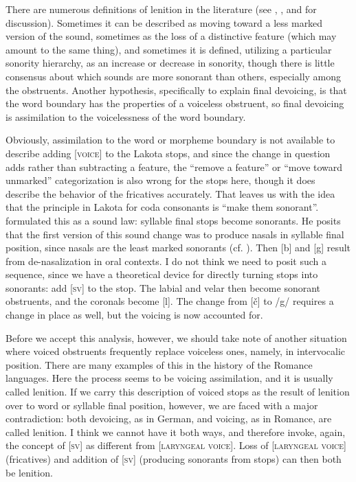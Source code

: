 \documentclass[output=paper]{LSP/langsci}
\begin{document}
There are numerous definitions of lenition in the literature (see \citealt{Honeybone2008}, \citealt{Harris2009}, and \citealt{Szigetvari2008} for discussion). Sometimes it can be described as moving toward a less marked version of the sound, sometimes as the loss of a distinctive feature (which may amount to the same thing), and sometimes it is defined, utilizing a particular sonority hierarchy, as an increase or decrease in sonority, though there is little consensus about which sounds are more sonorant than others, especially among the obstruents. Another hypothesis, specifically to explain final devoicing, is that the word boundary has the properties of a voiceless obstruent, so final devoicing is assimilation to the voicelessness of the word boundary.

Obviously, assimilation to the word or morpheme boundary is not available to describe adding [\textsc{voice}] to the Lakota stops, and since the change in question adds rather than subtracting a feature, the ``remove a feature'' or ``move toward unmarked'' categorization is also wrong for the stops here, though it does describe the behavior of the fricatives accurately. That leaves us with the idea that the principle in Lakota for coda consonants is ``make them sonorant''. \citet[5]{Rankin2001} formulated this as a sound law: syllable final stops become sonorants. He posits that the first version of this sound change was to produce nasals in syllable final position, since nasals are the least marked sonorants (cf. \citealt{Rice1993}). Then [b] and [g] result from de-nasalization in oral contexts. I do not think we need to posit such a sequence, since we have a theoretical device for directly turning stops into sonorants: add [\textsc{sv}] to the stop. The labial and velar then become sonorant obstruents, and the coronals become [l]. The change from [\v{c}] to /g/ requires a change in place as well, but the voicing is now accounted for.

Before we accept this analysis, however, we should take note of another situation where voiced obstruents frequently replace voiceless ones, namely, in intervocalic position. There are many examples of this in the history of the Romance languages. Here the process seems to be voicing assimilation, and it is usually called lenition. If we carry this description of voiced stops as the result of lenition over to word or syllable final position, however, we are faced with a major contradiction: both devoicing, as in German, and voicing, as in Romance, are called lenition. I think we cannot have it both ways, and therefore invoke, again, the concept of [\textsc{sv}] as different from [\textsc{laryngeal voice}]. Loss of [\textsc{laryngeal voice}] (fricatives) and addition of [\textsc{sv}] (producing sonorants from stops) can then both be lenition.
\end{document}
